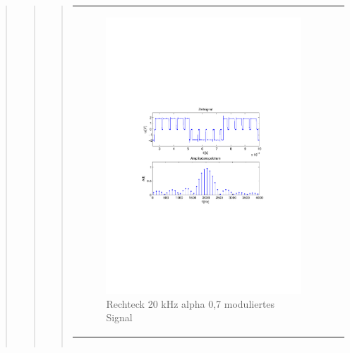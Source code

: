 \begin{quote}
\begin{quote}
\begin{quote}
\begin{center}
\begin{tabular}{ll}
                \begin{minipage}{0.6\textwidth}
                    \begin{figure}[H]
                        \includegraphics[scale=0.55, trim = 16mm 70mm 16mm 85mm, clip]{Bilder/shaperec20_07abget_zeit}
                       \caption{Rechteck 20 kHz alpha 0,7 moduliertes Signal}
		              \label{fig:shaperec20_07zeit}
                    \end{figure}
                \end{minipage}
            
            \end{tabular}
            \end{center}
            
            \begin{center}
            \begin{tabular}{ll}
            

\end{tabular}
\end{center}
\end{quote}
\end{quote}
\end{quote}
